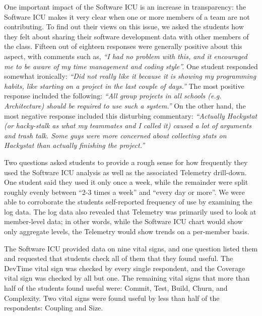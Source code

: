 \documentclass[10pt,twocolumn]{article}
\begin{document}
One important impact of the Software ICU is an increase in transparency:
the Software ICU makes it very clear when one or more members of a team are
not contributing.  To find out their views on this issue, we asked the
students how they felt about sharing their software development data with
other members of the class.  Fifteen out of eighteen responses were
generally positive about this aspect, with comments such as, {\em ``I had
no problem with this, and it encouraged me to be aware of my time
management and coding style''.}  One student responded somewhat ironically:
{\em ``Did not really like it because it is showing my programming habits,
like starting on a project in the last couple of days.''}  The most
positive response included the following: {\em ``All group projects in all
schools (e.g. Architecture) should be required to use such a system.''}  On
the other hand, the most negative response included this disturbing
commentary: {\em ``Actually Hackystat (or hacky-stalk as what my teammates
and I called it) caused a lot of arguments and trash talk.  Some guys were
more concerned about collecting stats on Hackystat than actually finishing
the project.''}


Two questions asked students to provide a rough sense for how frequently
they used the Software ICU analysis as well as the associated Telemetry
drill-down.  One student said they used it only once a week, while the
remainder were split roughly evenly between ``2-3 times a week'' and
``every day or more''.  We were able to corroborate the students
self-reported frequency of use by examining the log data.  The log data
also revealed that Telemetry was primarily used to look at member-level
data; in other words, while the Software ICU chart would show only
aggregate levels, the Telemetry would show trends on a per-member basis.


The Software ICU provided data on nine vital signs, and one question listed
them and requested that students check all of them that they found useful.
The DevTime vital sign was checked by every single respondent, and the
Coverage vital sign was checked by all but one.  The remaining vital signs
that more than half of the students found useful were: Commit, Test, Build,
Churn, and Complexity.  Two vital signs were found useful by less than half of the
respondents: Coupling and Size.
\end{document}
